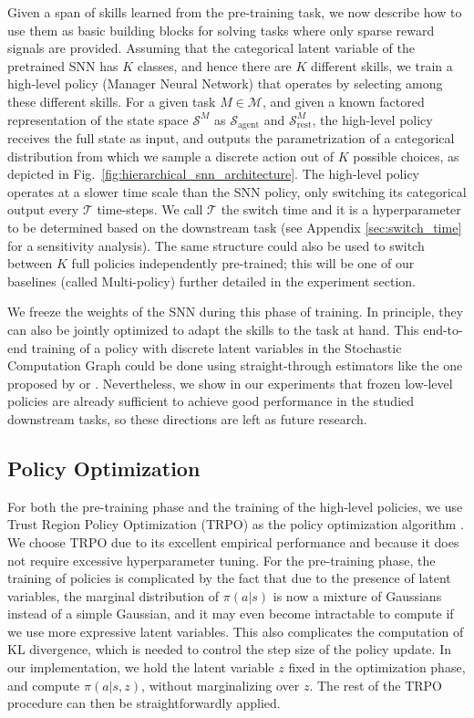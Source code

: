 \documentclass{article} %
\newcommand{\sset}{\mathcal{S}}
\newcommand{\mdpset}{\mathcal{M}}
\newcommand{\agent}{\mathrm{agent}}
\begin{document}
Given a span of skills learned from the pre-training task, we now describe how to use them as basic building blocks for solving tasks where only sparse reward signals are provided. Assuming that the categorical latent variable of the pretrained SNN has $K$ classes, and hence there are $K$ different skills, we train a high-level policy (Manager Neural Network) that operates by selecting among these different skills. 
For a given task $M \in \mdpset$, and given a known factored representation of the state space $\sset^M$ as $\sset_\agent$ and $\sset_{\mathrm{rest}}^M$, the high-level policy receives the full state as input, and outputs the parametrization of a categorical distribution from which we sample a discrete action out of $K$ possible choices, as depicted in Fig.\ \ref{fig:hierarchical_snn_architecture}. 
The high-level policy operates at a slower time scale than the SNN policy, only switching its categorical output every $\mathcal{T}$ time-steps. We call $\mathcal{T}$ the switch time and it is a hyperparameter to be determined based on the downstream task (see Appendix \ref{sec:switch_time} for a sensitivity analysis). 
The same structure could also be used to switch between $K$ full policies independently pre-trained; this will be one of our baselines (called Multi-policy) further detailed in the experiment section.

We freeze the weights of the SNN during this phase of training. In principle, they can also be jointly optimized to adapt the skills to the task at hand. This end-to-end training of a policy with discrete latent variables in the Stochastic Computation Graph could be done using straight-through estimators like the one proposed by \cite{jang2016gumbel} or \cite{maddison2016concrete}. Nevertheless, we show in our experiments that frozen low-level policies are already sufficient to achieve good performance in the studied downstream tasks, so these directions are left as future research.


\subsection{Policy Optimization}
\label{section:method:polopt}

For both the pre-training phase and the training of the high-level policies, we use Trust Region Policy Optimization (TRPO) as the policy optimization algorithm \citep{Schulman15TRPO}. We choose TRPO due to its excellent empirical performance and because it does not require excessive hyperparameter tuning. For the pre-training phase, the training of policies is complicated by the fact that due to the presence of latent variables, the marginal distribution of $\pi(a|s)$ is now a mixture of Gaussians instead of a simple Gaussian, and it may even become intractable to compute if we use more expressive latent variables. This also complicates the computation of KL divergence, which is needed to control the step size of the policy update. In our implementation, we hold the latent variable $z$ fixed in the optimization phase, and compute $\pi(a|s,z)$, without marginalizing over $z$. The rest of the TRPO procedure can then be straightforwardly applied.
\end{document}
